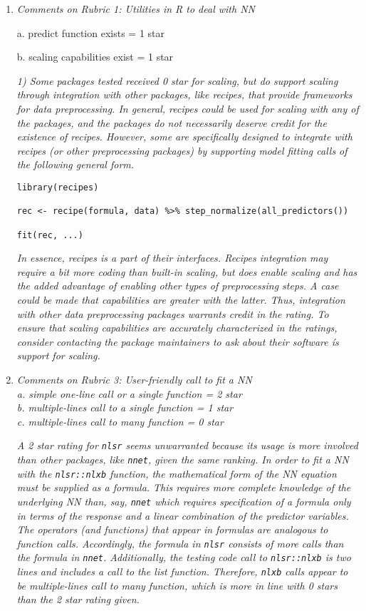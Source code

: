 \documentclass[12pt]{article}
\newcommand{\code}{\texttt}
\begin{document}
\begin{enumerate}


\item \textit{Comments on Rubric 1: Utilities in R to deal with NN}

       a. predict function exists = 1 star

       b. scaling capabilities exist = 1 star


\textit{
1)  Some packages tested received 0 star for scaling, but do support scaling through integration with other packages, like recipes, that provide frameworks for data preprocessing.  In general, recipes could be used for scaling with any of the packages, and the packages do not necessarily deserve credit for the existence of recipes.  However, some are specifically designed to integrate with recipes (or other preprocessing packages) by supporting model fitting calls of the following general form.
}

\begin{verbatim}
library(recipes)

rec <- recipe(formula, data) %>% step_normalize(all_predictors())

fit(rec, ...)
\end{verbatim}

\textit{
In essence, recipes is a part of their interfaces.  Recipes integration may require a bit more coding than built-in scaling, but does enable scaling and has the added advantage of enabling other types of preprocessing steps.  A case could be made that capabilities are greater with the latter.  Thus, integration with other data preprocessing packages warrants credit in the rating.  To ensure that scaling capabilities are accurately characterized in the ratings, consider contacting the package maintainers to ask about their software ís support for scaling.
}

\item \textit{
Comments on Rubric 3: User-friendly call to fit a NN\\
       a. simple one-line call or a single function = 2 star\\
       b. multiple-lines call to a single function = 1 star\\
       c. multiple-lines call to many function = 0 star}

       
 \textit{A 2 star rating for \code{nlsr} seems unwarranted because its usage is more involved than other packages, like \code{nnet}, given the same ranking.  In order to fit a NN with the \code{nlsr::nlxb} function, the mathematical form of the NN equation must be supplied as a formula.  This requires more complete knowledge of the underlying NN than, say, \code{nnet} which requires specification of a formula only in terms of the response and a linear combination of the predictor variables.  The operators (and functions) that appear in formulas are analogous to function calls.  Accordingly, the formula in \code{nlsr} consists of more calls than the formula in \code{nnet}.  Additionally, the testing code call to \code{nlsr::nlxb} is two lines and includes a call to the list function.  Therefore, \code{nlxb} calls appear to be multiple-lines call to many function, which is more in line with 0 stars than the 2 star rating given.}


\end{enumerate}
\end{document}
